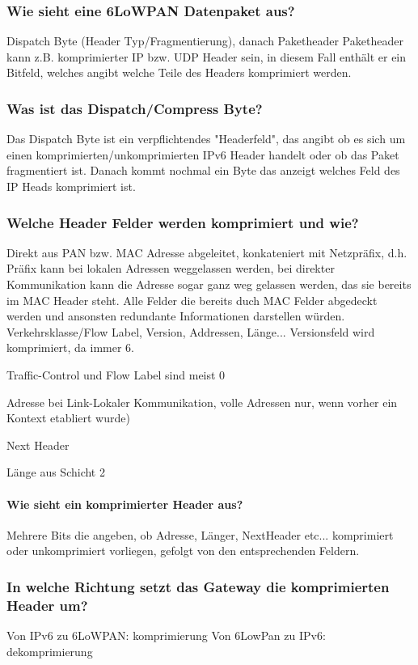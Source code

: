 		\subsubsection{Wie sieht eine 6LoWPAN Datenpaket aus?}
		Dispatch\- Byte (Header\- Typ/Fragmentierung), danach Paketheader
		Paketheader kann z.B. komprimierter IP\-  bzw. UDP\- Header sein, in diesem Fall enthält er ein Bitfeld, welches angibt welche Teile des Headers komprimiert werden.
		\subsubsection{Was ist das Dispatch/Compress Byte?}
		Das Dispatch Byte ist ein verpflichtendes "Headerfeld", das angibt ob es sich um einen komprimierten/unkomprimierten IPv6 Header handelt oder ob das Paket fragmentiert ist. Danach kommt nochmal ein Byte das anzeigt welches Feld des IP Heads komprimiert ist.
		\subsubsection{Welche Header Felder werden komprimiert und wie?}
		Direkt aus PAN bzw. MAC\- Adresse abgeleitet, konkateniert mit Netzpräfix, d.h. Präfix kann bei lokalen Adressen weggelassen werden, bei direkter Kommunikation kann die Adresse sogar ganz weg gelassen werden, das sie bereits im MAC\- Header steht.
		Alle Felder die bereits duch MAC Felder abgedeckt werden und ansonsten redundante Informationen darstellen würden.
		Verkehrsklasse/Flow Label, Version, Addressen, Länge...
		Versionsfeld wird komprimiert, da immer 6.
		
		Traffic-Control und Flow Label sind meist 0
		
		Adresse bei Link-Lokaler Kommunikation,  volle Adressen nur, wenn vorher ein Kontext etabliert wurde)
		
		Next Header
		
		Länge aus Schicht 2 
		
		\paragraph{Wie sieht ein komprimierter Header aus?}
		Mehrere Bits die angeben, ob Adresse, Länger, NextHeader etc... komprimiert oder unkomprimiert vorliegen, gefolgt von den entsprechenden Feldern.
		
		\subsubsection{In welche Richtung setzt das Gateway die komprimierten Header um?}
		Von IPv6 zu 6LoWPAN: komprimierung
		Von 6LowPan zu IPv6: dekomprimierung
		
